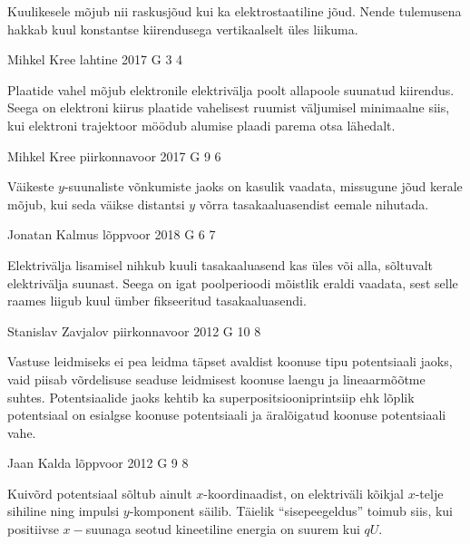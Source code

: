 \documentclass[11pt, twoside]{article}
\begin{document}
{{\ifHint
Kuulikesele mõjub nii raskusjõud kui ka elektrostaatiline jõud. Nende tulemusena hakkab kuul konstantse kiirendusega vertikaalselt üles liikuma.
\fi
}

{Mihkel Kree} %
{lahtine} %
{2017} %
{G 3} %
{4} %
{

\ifHint
Plaatide vahel mõjub elektronile elektrivälja poolt allapoole suunatud kiirendus. Seega on elektroni kiirus plaatide vahelisest ruumist väljumisel minimaalne siis, kui elektroni trajektoor möödub alumise plaadi parema otsa lähedalt.
\fi
}

{Mihkel Kree} %
{piirkonnavoor} %
{2017} %
{G 9} %
{6} %
{

\ifHint
Väikeste $y$-suunaliste võnkumiste jaoks on kasulik vaadata, missugune jõud kerale mõjub, kui seda väikse distantsi $y$ võrra tasakaaluasendist eemale nihutada.
\fi
}

{Jonatan Kalmus} %
{lõppvoor} %
{2018} %
{G 6} %
{7} %
{

\ifHint
Elektrivälja lisamisel nihkub kuuli tasakaaluasend kas üles või alla, sõltuvalt elektrivälja suunast. Seega on igat poolperioodi mõistlik eraldi vaadata, sest selle raames liigub kuul ümber fikseeritud tasakaaluasendi.
\fi
}

{Stanislav Zavjalov} %
{piirkonnavoor} %
{2012} %
{G 10} %
{8} %
{

\ifHint
Vastuse leidmiseks ei pea leidma täpset avaldist koonuse tipu potentsiaali jaoks, vaid piisab võrdelisuse seaduse leidmisest koonuse laengu ja lineaarmõõtme suhtes. Potentsiaalide jaoks kehtib ka superpositsiooniprintsiip ehk lõplik potentsiaal on esialgse koonuse potentsiaali ja äralõigatud koonuse potentsiaali vahe.
\fi
}

{Jaan Kalda} %
{lõppvoor} %
{2012} %
{G 9} %
{8} %
{

\ifHint
Kuivõrd potentsiaal sõltub ainult $x$-koordinaadist, on elektriväli kõikjal $x$-telje sihiline ning
impulsi $y$-komponent säilib. Täielik \enquote{sisepeegeldus} toimub siis, kui positiivse $x-$suunaga 
seotud kineetiline energia on suurem kui $qU$.
\fi
}

}
\end{document}

